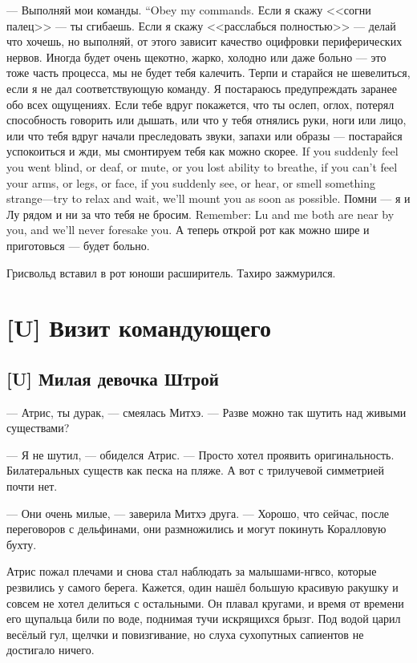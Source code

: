 {--- Выполняй мои команды.}
{``Obey my commands.}
Если я скажу <<согни палец>> --- ты сгибаешь.
Если я скажу <<расслабься полностью>> --- делай что хочешь, но выполняй, от этого зависит качество оцифровки периферических нервов.
Иногда будет очень щекотно, жарко, холодно или даже больно --- это тоже часть процесса, мы не будет тебя калечить.
Терпи и старайся не шевелиться, если я не дал соответствующую команду.
Я постараюсь предупреждать заранее обо всех ощущениях.
{Если тебе вдруг покажется, что ты ослеп, оглох, потерял способность говорить или дышать, или что у тебя отнялись руки, ноги или лицо, или что тебя вдруг начали преследовать звуки, запахи или образы --- постарайся успокоиться и жди, мы смонтируем тебя как можно скорее.}
{If you suddenly feel you went blind, or deaf, or mute, or you lost ability to breathe, if you can't feel your arms, or legs, or face, if you suddenly see, or hear, or smell something strange---try to relax and wait, we'll mount you as soon as possible.}
{Помни --- я и Лу рядом и ни за что тебя не бросим.}
{Remember: Lu and me both are near by you, and we'll never foresake you.}
А теперь открой рот как можно шире и приготовься --- будет больно.

Грисвольд вставил в рот юноши расширитель.
Тахиро зажмурился.

\chapter{[U] Визит командующего}

\section{[U] Милая девочка Штрой}

--- Атрис, ты дурак, --- смеялась Митхэ.
--- Разве можно так шутить над живыми существами?

--- Я не шутил, --- обиделся Атрис.
--- Просто хотел проявить оригинальность.
Билатеральных существ как песка на пляже.
А вот с трилучевой симметрией почти нет.

--- Они очень милые, --- заверила Митхэ друга.
--- Хорошо, что сейчас, после переговоров с дельфинами, они размножились и могут покинуть Коралловую бухту.

Атрис пожал плечами и снова стал наблюдать за малышами-нгвсо, которые резвились у самого берега.
Кажется, один нашёл большую красивую ракушку и совсем не хотел делиться с остальными.
Он плавал кругами, и время от времени его щупальца били по воде, поднимая тучи искрящихся брызг.
Под водой царил весёлый гул, щелчки и повизгивание, но слуха сухопутных сапиентов не достигало ничего.

